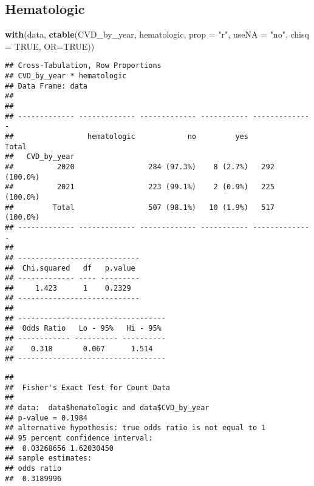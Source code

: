 \documentclass[
]{article}
\newenvironment{Shaded}{\begin{snugshade}}{\end{snugshade}}
\newcommand{\AttributeTok}[1]{\textcolor[rgb]{0.13,0.29,0.53}{#1}}
\newcommand{\ConstantTok}[1]{\textcolor[rgb]{0.56,0.35,0.01}{#1}}
\newcommand{\FunctionTok}[1]{\textcolor[rgb]{0.13,0.29,0.53}{\textbf{#1}}}
\newcommand{\NormalTok}[1]{#1}
\newcommand{\SpecialCharTok}[1]{\textcolor[rgb]{0.81,0.36,0.00}{\textbf{#1}}}
\newcommand{\StringTok}[1]{\textcolor[rgb]{0.31,0.60,0.02}{#1}}
\begin{document}
\hypertarget{hematologic}{%
\subsection{Hematologic}\label{hematologic}}

\begin{Shaded}
\begin{Highlighting}[]
\FunctionTok{with}\NormalTok{(data, }\FunctionTok{ctable}\NormalTok{(CVD\_by\_year, hematologic, }\AttributeTok{prop =} \StringTok{"r"}\NormalTok{, }\AttributeTok{useNA =} \StringTok{"no"}\NormalTok{, }\AttributeTok{chisq =} \ConstantTok{TRUE}\NormalTok{, }\AttributeTok{OR=}\ConstantTok{TRUE}\NormalTok{))}
\end{Highlighting}
\end{Shaded}

\begin{verbatim}
## Cross-Tabulation, Row Proportions  
## CVD_by_year * hematologic  
## Data Frame: data  
## 
## 
## ------------- ------------- ------------- ----------- --------------
##                 hematologic            no         yes          Total
##   CVD_by_year                                                       
##          2020                 284 (97.3%)    8 (2.7%)   292 (100.0%)
##          2021                 223 (99.1%)    2 (0.9%)   225 (100.0%)
##         Total                 507 (98.1%)   10 (1.9%)   517 (100.0%)
## ------------- ------------- ------------- ----------- --------------
## 
## ----------------------------
##  Chi.squared   df   p.value 
## ------------- ---- ---------
##     1.423      1    0.2329  
## ----------------------------
## 
## ----------------------------------
##  Odds Ratio   Lo - 95%   Hi - 95% 
## ------------ ---------- ----------
##    0.318       0.067      1.514   
## ----------------------------------
\end{verbatim}

\begin{Shaded}
\end{Shaded}

\begin{verbatim}
## 
##  Fisher's Exact Test for Count Data
## 
## data:  data$hematologic and data$CVD_by_year
## p-value = 0.1984
## alternative hypothesis: true odds ratio is not equal to 1
## 95 percent confidence interval:
##  0.03268656 1.62030450
## sample estimates:
## odds ratio 
##  0.3189996
\end{verbatim}
\end{document}
